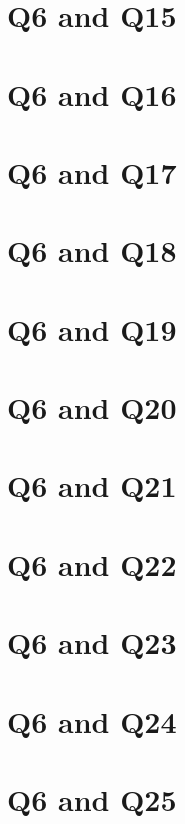 \documentclass{report}
\begin{document}
\clearpage
\section{Q6 and Q15}


\clearpage
\section{Q6 and Q16}


\clearpage
\section{Q6 and Q17}


\clearpage
\section{Q6 and Q18}


\clearpage
\section{Q6 and Q19}


\clearpage
\section{Q6 and Q20}


\clearpage
\section{Q6 and Q21}


\clearpage
\section{Q6 and Q22}


\clearpage
\section{Q6 and Q23}


\clearpage
\section{Q6 and Q24}


\clearpage
\section{Q6 and Q25}

\end{document}
